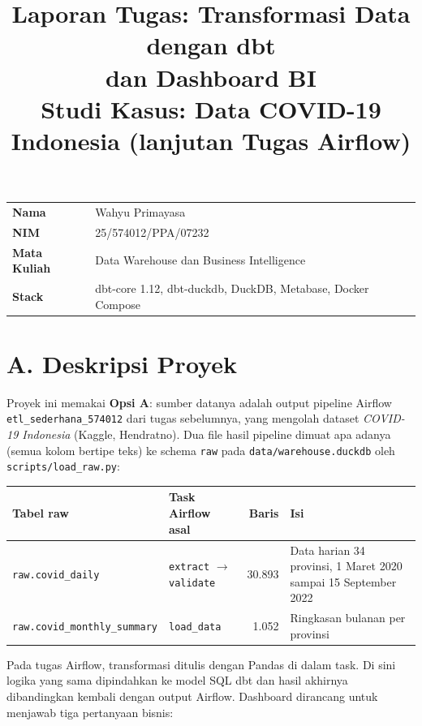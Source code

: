 \documentclass[11pt]{article}
\title{\vspace{-1.5em}\textbf{\Large Laporan Tugas: Transformasi Data dengan dbt\\ dan Dashboard BI}\\[0.3em]
\normalsize Studi Kasus: Data COVID-19 Indonesia (lanjutan Tugas Airflow)}
\author{}
\date{}
\newcommand{\sectionrule}{\vspace{-0.3em}\noindent{\color{headingpurple}\rule{\linewidth}{0.6pt}}\vspace{0.4em}}
\begin{document}
\maketitle
\vspace{-6.5em}

\noindent
\begin{tabular}{ll}
\textbf{Nama} & Wahyu Primayasa \\
\textbf{NIM} & 25/574012/PPA/07232 \\
\textbf{Mata Kuliah} & Data Warehouse dan Business Intelligence \\
\textbf{Stack} & dbt-core 1.12, dbt-duckdb, DuckDB, Metabase, Docker Compose \\
\end{tabular}
\vspace{0.6em}

\sectionrule

\section*{A. Deskripsi Proyek}

Proyek ini memakai \textbf{Opsi A}: sumber datanya adalah output pipeline
Airflow \texttt{etl\_sederhana\_574012} dari tugas sebelumnya, yang mengolah
dataset \textit{COVID-19 Indonesia} (Kaggle, Hendratno). Dua file hasil
pipeline dimuat apa adanya (semua kolom bertipe teks) ke schema \texttt{raw}
pada \texttt{data/warehouse.duckdb} oleh \texttt{scripts/load\_raw.py}:

\begin{center}
\begin{minipage}{\linewidth}\centering\small
{}
\begin{tabular}{@{}l l r p{5.0cm}@{}}
\toprule
\textbf{Tabel raw} & \textbf{Task Airflow asal} & \textbf{Baris} & \textbf{Isi} \\
\midrule
\texttt{raw.covid\_daily} & \texttt{extract} $\rightarrow$ \texttt{validate} & 30.893 & Data harian 34 provinsi, 1 Maret 2020 sampai 15 September 2022 \\
\texttt{raw.covid\_monthly\_summary} & \texttt{load\_data} & 1.052 & Ringkasan bulanan per provinsi \\
\bottomrule
\end{tabular}
\end{minipage}
\end{center}

Pada tugas Airflow, transformasi ditulis dengan Pandas di dalam task. Di sini
logika yang sama dipindahkan ke model SQL dbt 
dan hasil akhirnya dibandingkan kembali dengan output Airflow. Dashboard
dirancang untuk menjawab tiga pertanyaan bisnis:
\end{document}

